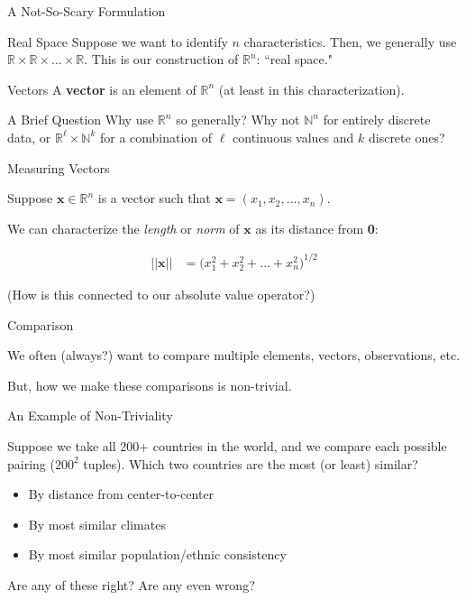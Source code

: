 \documentclass[10pt]{beamer}
\begin{document}
\begin{frame}{A Not-So-Scary Formulation}
     \begin{block}{Real Space}
        Suppose we want to identify $n$ characteristics. Then, we generally use $\mathbb{R} \times \mathbb{R} \times ... \times \mathbb{R}$. This is our construction of $\mathbb{R}^n$: ``real space."
    \end{block}

    \begin{block}{Vectors}
    A \textbf{vector} is an element of $\mathbb{R}^n$ (at least in this characterization).
    \end{block}
\end{frame}

\begin{frame}{A Brief Question}
    Why use $\mathbb{R}^n$ so generally? Why not $\mathbb{N}^n$ for entirely discrete data, or $\mathbb{R}^\ell \times \mathbb{N}^k$ for a combination of $\ell$ continuous values and $k$ discrete ones? 
\end{frame}

\begin{frame}{Measuring Vectors}

Suppose $\textbf{x} \in \mathbb{R}^n$ is a vector such that $\textbf{x} = (x_1,x_2,...,x_n)$.

We can characterize the \emph{length} or \emph{norm} of $\textbf{x}$ as its distance from \textbf{0}:

\begin{align*}
    ||\textbf{x}|| &= \Big(x_1^2 + x_2^2 + ... + x_n^2 \Big)^{1/2}
\end{align*}

(How is this connected to our absolute value operator?)

\end{frame}

\begin{frame}{Comparison}

    We often (always?) want to compare multiple elements, vectors, observations, etc.

    But, how we make these comparisons is non-trivial.

\end{frame}

\begin{frame}{An Example of Non-Triviality}

Suppose we take all 200+ countries in the world, and we compare each possible pairing ($200^2$ tuples). Which two countries are the most (or least) similar?

\begin{itemize}
    \item By distance from center-to-center
    \item By most similar climates
    \item By most similar population/ethnic consistency
\end{itemize}

Are any of these right? Are any even wrong?

\end{frame}
\end{document}
